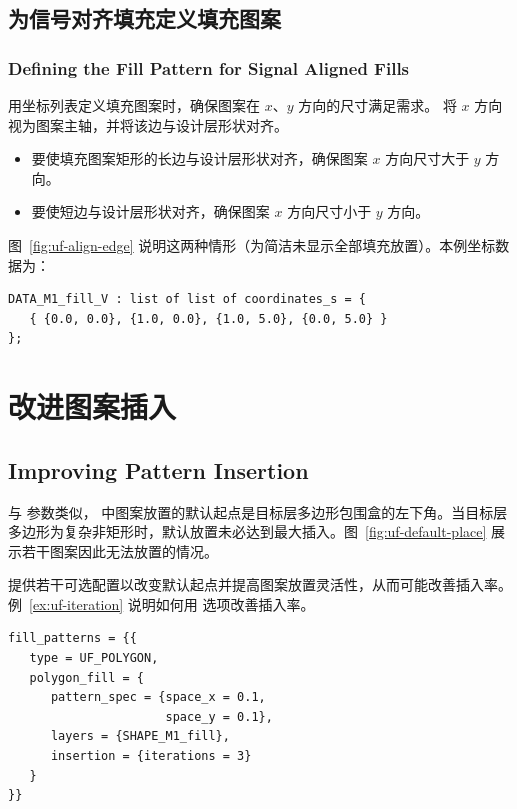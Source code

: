\subsection{为信号对齐填充定义填充图案}
\subsubsection*{Defining the Fill Pattern for Signal Aligned Fills}

用坐标列表定义填充图案时，确保图案在 $x$、$y$ 方向的尺寸满足需求。 将 $x$ 方向视为图案主轴，并将该边与设计层形状对齐。
\begin{itemize}
  \item 要使填充图案矩形的长边与设计层形状对齐，确保图案 $x$ 方向尺寸大于 $y$ 方向。
  \item 要使短边与设计层形状对齐，确保图案 $x$ 方向尺寸小于 $y$ 方向。
\end{itemize}
图~\ref{fig:uf-align-edge} 说明这两种情形（为简洁未显示全部填充放置）。本例坐标数据为：
\begin{lstlisting}[style=pxl]
DATA_M1_fill_V : list of list of coordinates_s = {
   { {0.0, 0.0}, {1.0, 0.0}, {1.0, 5.0}, {0.0, 5.0} }
};
\end{lstlisting}


\section{改进图案插入}
\subsection*{Improving Pattern Insertion}

与  参数类似， 中图案放置的默认起点是目标层多边形包围盒的左下角。当目标层多边形为复杂非矩形时，默认放置未必达到最大插入。图~\ref{fig:uf-default-place} 展示若干图案因此无法放置的情况。


 提供若干可选配置以改变默认起点并提高图案放置灵活性，从而可能改善插入率。
例~\ref{ex:uf-iteration} 说明如何用  选项改善插入率。

\begin{lstlisting}[style=pxl,caption={使用 iteration 选项},label={ex:uf-iteration}]
fill_patterns = {{
   type = UF_POLYGON,
   polygon_fill = {
      pattern_spec = {space_x = 0.1,
                      space_y = 0.1},
      layers = {SHAPE_M1_fill},
      insertion = {iterations = 3}
   }
}}
\end{lstlisting}

